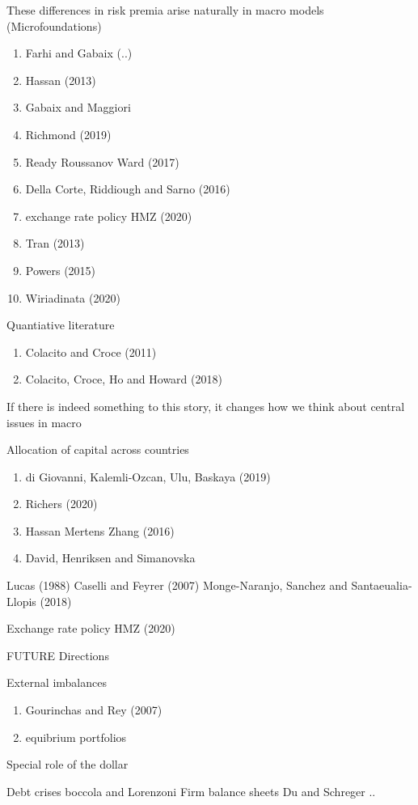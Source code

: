 \documentclass[12pt,letter]{article}
\theoremstyle{break} \theorembodyfont{\normalfont\itshape}
\theoremstyle{break}
\theoremstyle{break} \theorembodyfont{\normalfont\itshape}
\theoremstyle{break} \theorembodyfont{\normalfont\itshape}
\begin{document}
These differences in risk premia arise naturally in macro models (Microfoundations)
\begin{enumerate}
    \item Farhi and Gabaix (..)    
    \item Hassan (2013)
    \item Gabaix and Maggiori
     \item Richmond (2019)
    \item Ready Roussanov Ward (2017)  
    \item Della Corte, Riddiough and Sarno (2016)
    \item exchange rate policy HMZ (2020)
    \item Tran (2013)
    \item Powers (2015)
    \item Wiriadinata (2020)
\end{enumerate}

Quantiative literature
    \begin{enumerate}
        \item Colacito and Croce (2011)
        \item Colacito, Croce, Ho and Howard (2018)
    \end{enumerate}


If there is indeed something to this story, it changes how we think about central issues in macro

Allocation of capital across countries
\begin{enumerate}
    \item di Giovanni, Kalemli-Ozcan, Ulu, Baskaya (2019)
    \item Richers (2020)
    \item Hassan Mertens Zhang (2016)
    \item David, Henriksen and Simanovska
\end{enumerate}
Lucas (1988)
Caselli and Feyrer (2007)
Monge-Naranjo, Sanchez and Santaeualia-Llopis (2018)

Exchange rate policy
HMZ (2020)

FUTURE Directions 

External imbalances
\begin{enumerate}
    \item Gourinchas and Rey (2007)
    \item equibrium portfolios
\end{enumerate}

Special role of the dollar

Debt crises
boccola and Lorenzoni
Firm balance sheets
Du and Schreger ..
\end{document}
